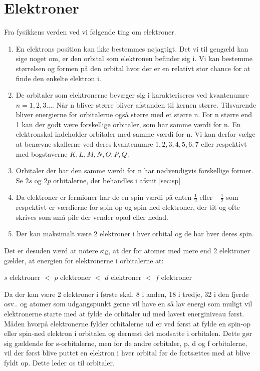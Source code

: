\section{Elektroner}\label{elektroner}
Fra fysikkens verden ved vi følgende ting om elektroner. 

\begin{enumerate}
\item En elektrons position kan ikke bestemmes nøjagtigt. Det vi til gengæld kan sige noget om, er den orbital som elektronen befinder sig i. Vi kan bestemme størrelsen og formen på den orbital hvor der er en relativt stor chance for at finde den enkelte elektron i.

\item De orbitaler som elektronerne bevæger sig i karakteriseres ved kvantenumre $n = 1,2,3 ...$. Når n bliver større bliver afstanden til kernen større. Tilsvarende bliver energierne for orbitalerne også større med et større n. For n større end 1 kan der godt være forskellige orbitaler, som har samme værdi for n. En elektronskal indeholder orbitaler med samme værdi for n. Vi kan derfor vælge at benævne skallerne ved deres kvantenumre $1,2,3,4,5,6,7$ eller respektivt med bogstaverne $K,L,M,N,O,P,Q$. 

\item Orbitaler der har den samme værdi for n har nødvendigvis forskellige former. Se $2s$ og $2p$ orbitalerne, der behandles i afsnit \ref{sec:sp}

\item Da elektroner er fermioner har de en spin-værdi på enten $\frac{1}{2}$ eller $-\frac{1}{2}$ som respektivt er værdierne for spin-op og spin-ned elektroner, der tit og ofte skrives som små pile der vender opad eller nedad.

\item Der kan maksimalt være 2 elektroner i hver orbital og de har hver deres spin.
\end{enumerate}

Det er desuden værd at notere sig, at der for atomer med mere end 2 elektroner gælder, at energien for elektronerne i orbitalerne at:

\bigskip
\begin{center}
$s$ elektroner $<$ $p$ elektroner $<$ $d$ elektroner $<$ $f$ elektroner
\end{center}
\bigskip

Da der kan være 2 elektroner i første skal, 8 i anden, 18 i tredje, 32 i den fjerde osv.. og atomer som udgangspunkt gerne vil have en så lav energi som muligt vil elektronerne starte med at fylde de orbitaler ud med lavest energiniveau først. Måden hvorpå elektronerne fylder orbitalerne ud er ved først at fylde en spin-op eller spin-ned elektron i orbitalen og dernæst det modsatte i orbitalen. Dette gør sig gældende for s-orbitalerne, men for de andre orbitaler, p, d og f orbitalerne, vil der først blive puttet en elektron i hver orbital før de fortsættes med at blive fyldt op. Dette leder os til orbitaler.